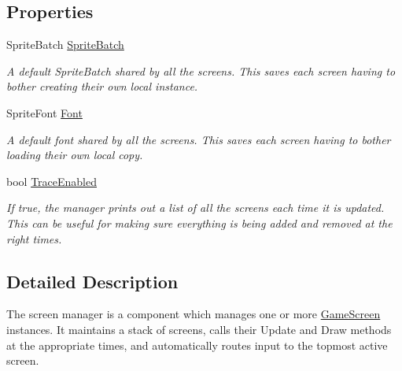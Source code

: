 \subsection*{Properties}
\begin{DoxyCompactItemize}
\item 
SpriteBatch \hyperlink{classCityMania_1_1ScreenManager_aa3760417a620217307bfe78170a01330}{SpriteBatch}
\begin{DoxyCompactList}\small\item\em A default SpriteBatch shared by all the screens. This saves each screen having to bother creating their own local instance. \item\end{DoxyCompactList}\item 
SpriteFont \hyperlink{classCityMania_1_1ScreenManager_af019d3ddc16fb36a2ad1106bf4081ef6}{Font}
\begin{DoxyCompactList}\small\item\em A default font shared by all the screens. This saves each screen having to bother loading their own local copy. \item\end{DoxyCompactList}\item 
bool \hyperlink{classCityMania_1_1ScreenManager_a1891dddceb1d3536129a0ae4689bb406}{TraceEnabled}
\begin{DoxyCompactList}\small\item\em If true, the manager prints out a list of all the screens each time it is updated. This can be useful for making sure everything is being added and removed at the right times. \item\end{DoxyCompactList}\end{DoxyCompactItemize}


\subsection{Detailed Description}
The screen manager is a component which manages one or more \hyperlink{classCityMania_1_1GameScreen}{GameScreen} instances. It maintains a stack of screens, calls their Update and Draw methods at the appropriate times, and automatically routes input to the topmost active screen. 

